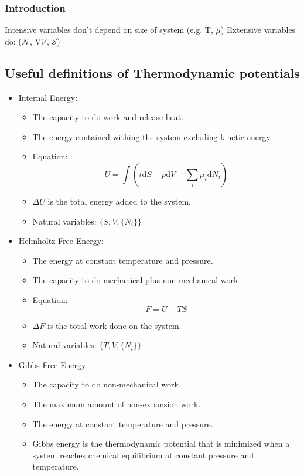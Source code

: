 \documentclass[11pt]{article}
\begin{document}
\subsubsection{Introduction}
\label{sec:org1c1afb1}
Intensive variables don't depend on size of system (e.g. T, \(\mu\))
Extensive variables do: (\(\mathcal{N}\), V\(\mathcal{V}\), \(\mathcal{S}\))
\subsection{Useful definitions of Thermodynamic potentials}
\label{sec:orgec23185}
\begin{itemize}
\item Internal Energy:
\begin{itemize}
\item The capacity to do work and release heat.
\item The energy contained withing the system excluding kinetic energy.
\item Equation: \[ U = \int ( t\text{d}S -p\text{d}V + \sum_{i}\mu_{i}\text{d}N_{i} ) \]
\item \(\Delta U\) is the total energy added to the system.
\item Natural variables: \(\{ S, V, \{N_{i}\} \}\)
\end{itemize}
\item Helmholtz Free Energy:
\begin{itemize}
\item The energy at constant temperature and pressure.
\item The capacity to do mechanical plus non-mechanical work
\item Equation: \[ F = U - TS \]
\item \(\Delta F\) is the total work done on the system.
\item Natural variables: \(\{ T, V, \{N_{i}\} \}\)
\end{itemize}
\item Gibbs Free Energy:
\begin{itemize}
\item The capacity to do non-mechanical work.
\item The maximum amount of non-expansion work.
\item The energy at constant temperature and pressure.
\item Gibbs energy is the thermodynamic potential that is minimized when a
system reaches chemical equilibrium at constant pressure and
temperature.
\end{itemize}

\end{itemize}
\end{document}
